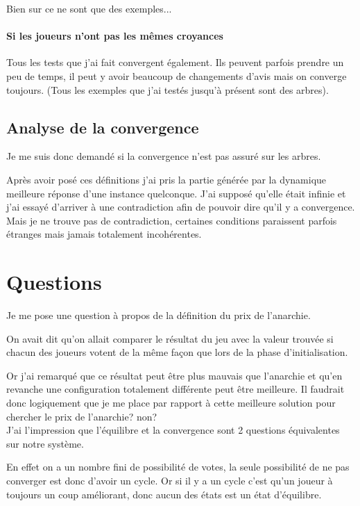 \documentclass[12pt]{article}
\theoremstyle{defi}
\theoremstyle{not}
\theoremstyle{prob}
\begin{document}
        Bien sur ce ne sont que des exemples...


      \paragraph{Si les joueurs n'ont pas les mêmes croyances}
        Tous les tests que j'ai fait convergent également. Ils peuvent parfois prendre un peu de temps, il peut y avoir beaucoup de changements d'avis mais on converge toujours.
        (Tous les exemples que j'ai testés jusqu'à présent sont des arbres).

    \subsection{Analyse de la convergence}
      Je me suis donc demandé si la convergence n'est pas assuré sur les arbres.



      Après avoir posé ces définitions j'ai pris la partie générée par la dynamique meilleure réponse d'une instance quelconque.
      J'ai supposé qu'elle était infinie et j'ai essayé d'arriver à une contradiction afin de pouvoir dire qu'il y a convergence.
      Mais je ne trouve pas de contradiction, certaines conditions paraissent parfois étranges mais jamais totalement incohérentes.

\color{black}
  \section{Questions}
    Je me pose une question à propos de la définition du prix de l'anarchie.

    On avait dit qu'on allait comparer le résultat du jeu avec la valeur trouvée si chacun des joueurs votent de la même façon que lors de la phase d'initialisation.

    Or j'ai remarqué que ce résultat peut être plus mauvais que l'anarchie et qu'en revanche une configuration totalement différente peut être meilleure. Il faudrait donc logiquement que je me place par rapport à cette meilleure solution pour chercher le prix de l'anarchie? non?\\

    \color{red}
    J'ai l'impression que l'équilibre et la convergence sont 2 questions équivalentes sur notre système.

    En effet on a un nombre fini de possibilité de votes, la seule possibilité de ne pas converger est donc d'avoir un cycle. Or si il y a un cycle c'est qu'un joueur à toujours un coup améliorant, donc aucun des états est un état d'équilibre.
\end{document}

